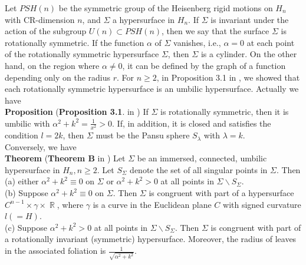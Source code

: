 \documentclass[12pt]{amsart}
\theoremstyle{definition}\newtheorem{exa}[thm]{\sc Example}
\theoremstyle{definition}\newtheorem{de}[thm]{\sc Definition}
\theoremstyle{definition}\newtheorem{rem}[thm]{\sc Remark}
\theoremstyle{definition}\newtheorem{prob}[thm]{\it Problem}
\theoremstyle{definition}\newtheorem{fact}[thm]{\sc Fact}
\theoremstyle{definition}\newtheorem{claim}[thm]{\sc Claim}
\numberwithin{equation}{section}
\DeclareMathOperator{\R}{\mathbb R}
\begin{document}
Let $PSH(n)$ be the symmetric group of the Heisenberg rigid motions on $H_{n}$ with CR-dimension $n$, and $\Sigma$ a hypersurface in $H_{n}$. If $\Sigma$ is invariant under the action of the subgroup $U(n)\subset PSH(n)$, then we say that the surface $\Sigma$ is rotationally symmetric. If the function $\alpha$ of $\Sigma$ vanishes, i.e., $\alpha=0$ at each point of the rotationally symmetric hypersurface $\Sigma$, then $\Sigma$ is a cylinder. On the other hand, on the region where $\alpha\neq 0$, it can be defined by the graph of a function depending only on the radius $r$. For $n\geq 2$, in Proposition 3.1 in \cite{CCHY1}, we showed that each rotationally symmetric hypersurface is an umbilic hypersurface. Actually we have\\

{\bf Proposition} ({\bf Proposition 3.1}. in \cite{CCHY1}) If $\Sigma$ is rotationally symmetric, then it is umbilic with $\alpha^{2}+k^{2}=\frac{1}{x^2}>0$. If, in addition, it is closed
and satisfies the condition $l=2k$, then $\Sigma$ must be the Pansu sphere $S_{\lambda}$ with $\lambda=k$.\\

Conversely, we have\\

{\bf Theorem} ({\bf Theorem B}  in \cite{CCHY2})  Let $\Sigma$ be an immersed, connected, umbilic hypersurface in $H_{n}, n\geq 2$. 
Let $S_{\Sigma}$ denote the set of all singular points in $\Sigma$. Then \\
(a) either $\alpha^{2}+k^{2}\equiv 0$ on $\Sigma$ or $\alpha^{2}+k^{2}>0$ at all points in $\Sigma\backslash S_{\Sigma}$.\\
(b) Suppose $\alpha^{2}+k^{2}\equiv 0$ on $\Sigma$. Then $\Sigma$ is congruent with part of a hypersurface $C^{n-1}\times\gamma\times\R$, where $\gamma$ is a curve in the Euclidean plane $C$ with signed curvature $l(=H)$.\\
(c) Suppose $\alpha^{2}+k^{2}>0$ at all points in $\Sigma\backslash S_{\Sigma}$. Then $\Sigma$ is congruent with part of a rotationally invariant (symmetric) hypersurface. Moreover, the radius of leaves in the associated foliation is $\frac{1}{\sqrt{\alpha^{2}+k^{2}}}$.\\
\end{document}
